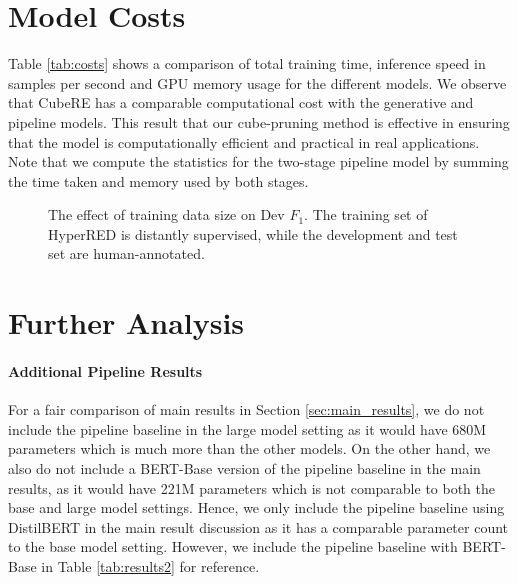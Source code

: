 \documentclass[11pt]{article}
\newcommand{\modelname}{CubeRE}
\begin{document}
\section{Model Costs}
\label{sec:efficiency}
Table \ref{tab:costs} shows a comparison of total training time, inference speed in samples per second and GPU memory usage for the different models. We observe that \modelname{} has a comparable computational cost with the generative and pipeline models. 
This result that our cube-pruning method is effective in ensuring that the model is computationally efficient and practical in real applications.
Note that we compute the statistics for the two-stage pipeline model by summing the time taken and memory used by both stages.


\begin{figure}
\centering
{}
\caption{
The effect of training data size on Dev $F_1$. 
The training set of HyperRED is distantly supervised, while the development and test set are human-annotated.\vspace{-3mm}}
\label{fig:data_size}
\end{figure}

\section{Further Analysis}
\label{sec:further}
\paragraph{Additional Pipeline Results}
For a fair comparison of main results in Section \ref{sec:main_results}, we do not include the pipeline baseline in the large model setting as it would have 680M parameters which is much more than the other models.
On the other hand, we also do not include a BERT-Base version of the pipeline baseline in the main results, as it would have 221M parameters which is not comparable to both the base and large model settings.
Hence, we only include the pipeline baseline using DistilBERT in the main result discussion as it has a comparable parameter count to the base model setting.
However, we include the pipeline baseline with BERT-Base in Table \ref{tab:results2} for reference.
\end{document}
